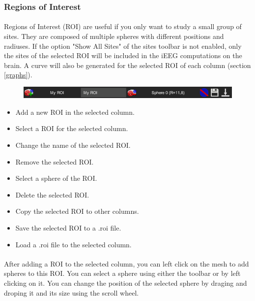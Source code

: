 \documentclass[a4paper]{article}
\begin{document}
\subsubsection{Regions of Interest}\label{roi}
\paragraph{} Regions of Interest (ROI) are useful if you only want to study a small group of sites. They are composed of multiple spheres with different positions and radiuses. If the option "Show All Sites" of the sites toolbar is not enabled, only the sites of the selected ROI will be included in the iEEG computations on the brain. A curve will also be generated for the selected ROI of each column (section \ref{graphs}).
\begin{figure}[H]
\begin{center}
\includegraphics[scale=0.5]{ROI.png}
\end{center}
\end{figure}
\begin{itemize}
\item Add a new ROI in the selected column.
\item Select a ROI for the selected column.
\item Change the name of the selected ROI.
\item Remove the selected ROI.
\item Select a sphere of the ROI.
\item Delete the selected ROI.
\item Copy the selected ROI to other columns.
\item Save the selected ROI to a .roi file.
\item Load a .roi file to the selected column.
\end{itemize}
\paragraph{} After adding a ROI to the selected column, you can left click on the mesh to add spheres to this ROI. You can select a sphere using either the toolbar or by left clicking on it. You can change the position of the selected sphere by draging and droping it and its size using the scroll wheel.
\end{document}
